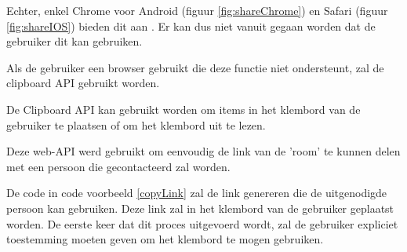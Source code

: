 		Echter, enkel Chrome voor Android (figuur \ref{fig:shareChrome}) en Safari (figuur \ref{fig:shareIOS}) bieden dit aan . Er kan dus niet vanuit gegaan worden dat de gebruiker dit kan gebruiken.

		Als de gebruiker een browser gebruikt die deze functie niet ondersteunt, zal de clipboard API gebruikt worden.
	
		De Clipboard API kan gebruikt worden om items in het klembord van de gebruiker te plaatsen of om het klembord uit te lezen.
		
		Deze web-API werd gebruikt om eenvoudig de link van de 'room' te kunnen delen met een persoon die gecontacteerd zal worden.
		
		De code in code voorbeeld \ref{copyLink} zal de link genereren die de uitgenodigde persoon kan gebruiken. Deze link zal in het klembord van de gebruiker geplaatst worden.
		De eerste keer dat dit proces uitgevoerd wordt, zal de gebruiker expliciet toestemming moeten geven om het klembord te mogen gebruiken.
		
